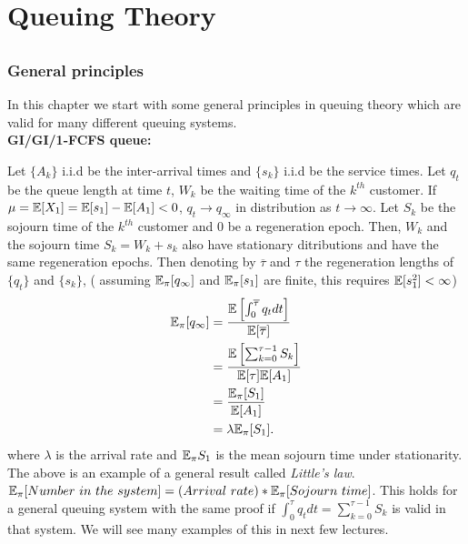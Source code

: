 \documentclass[all-lectures.tex]{subfiles}
\begin{document}

\setcounter{section}{1}
\setcounter{subsection}{1}
\chapter{Queuing Theory}
\section*{}
\subsection{General principles}
In this chapter we start with some general principles in queuing theory which are valid for many different queuing systems.\\ %

\textbf{GI/GI/1-FCFS queue:} 

Let $\{A_k\}$ i.i.d be the inter-arrival times and $\{s_k\}$ i.i.d be the service times. Let $q_t$ be the queue length at time $t$, $W_k$ be the waiting time of the $k^{th}$ customer. If $\mu = \mathbb{E}[X_1] = \mathbb{E}[s_1] - \mathbb{E}[A_1] < 0$, $q_t \to q_\infty$ in distribution as $t \to \infty$. Let $S_k$ be the sojourn time of the $k^{th}$ customer and $0$ be a regeneration epoch. Then, $W_k$ and the sojourn time $S_k = W_k + s_k$ also have stationary ditributions and have the same regeneration epochs. Then denoting by $\overline{\tau}$ and $\tau$ the regeneration lengths of $\{q_t\}$ and $\{s_k\}$, ( assuming $\mathbb{E}_\pi[q_\infty]$ and $\mathbb{E}_\pi[s_1]$ are finite, this requires $\mathbb{E}[s_1^2] < \infty$)
\begin{align*}
\mathbb{E}_{\pi}[q_\infty] &= \frac{\mathbb{E}\left[ \int_0^{\overline{\tau}} q_t dt\right]}{\mathbb{E}[\overline{\tau}]} \\
&= \frac{\mathbb{E}\left[ \sum_{k=0}^{\tau-1} S_k \right]}{\mathbb{E}[\tau]\mathbb{E}[A_1]} \\
&= \frac{ \mathbb{E}_{\pi}[S_1] }{\mathbb{E}[A_1]} \\
&= \lambda \mathbb{E}_{\pi}[S_1].
\end{align*}
where $\lambda$ is the arrival rate and $\mathbb{E}_{\pi} S_1$ is the mean sojourn time under stationarity. \\
\indent The above is an example of a general result called \textit{Little's law}. 
$\mathbb{E}_{\pi}[Number\ in\ the\ system] = (Arrival\ rate) * \mathbb{E}_{\pi}[Sojourn \ time]$. This holds for a general queuing system with the same proof if $\int_0^\tau q_t dt = \sum_{k=0}^{\tau -1} S_k$ is valid in that system. We will see many examples of this in next few lectures.\\
\end{document}
